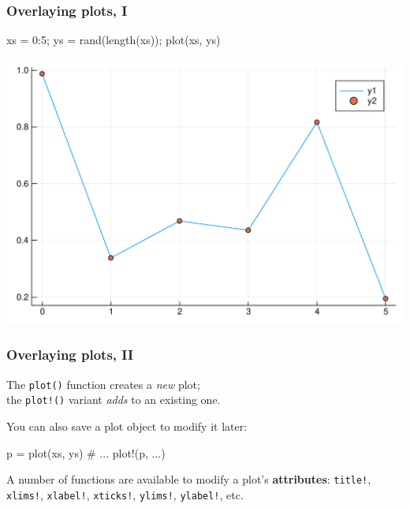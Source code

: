 \documentclass[english,serif,mathserif,xcolor=pdftex,dvipsnames,table]{beamer}
\begin{document}
\begin{frame}[fragile]
  \frametitle{Overlaying plots, I}
\begin{semiverbatim}\small
\julia xs = 0:5;
\julia ys = rand(length(xs));
\julia plot(xs, ys)
\julia {}
\end{semiverbatim}
  \begin{center}
    \includegraphics[height=0.66\textheight]{fig/plot2.pdf}
  \end{center}
\end{frame}


\begin{frame}[fragile]
  \frametitle{Overlaying plots, II}
  The \texttt{plot()} function creates a \emph{new} plot; \\
  the \texttt{plot!()} variant \emph{adds} to an existing one.

  \+
  You can also save a plot object to modify it later:
\begin{jl}
p = plot(xs, ys)
# ...
plot!(p, ...)
\end{jl}


  \+
  A number of functions are available to modify a plot's \textbf{attributes}:
  \texttt{title!}, \texttt{xlims!}, \texttt{xlabel!},
  \texttt{xticks!}, \texttt{ylims!}, \texttt{ylabel!}, etc.
\end{frame}
\end{document}

